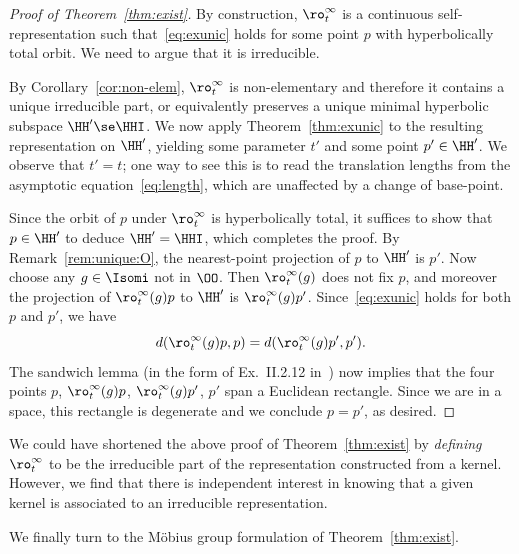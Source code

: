 \begin{proof}[Proof of Theorem~\ref{thm:exist}]
By construction, $\ro^\infty_t$ is a continuous self-representation such that~\eqref{eq:exunic} holds for some point $p$ with hyperbolically total orbit. We need to argue that it is irreducible.

By Corollary~\ref{cor:non-elem}, $\ro^\infty_t$ is non-elementary and therefore it contains a unique irreducible part, or equivalently preserves a unique minimal hyperbolic subspace $\HH'\se\HHI$. We now apply Theorem~\ref{thm:exunic} to the resulting representation on $\HH'$, yielding some parameter $t'$ and some point $p'\in\HH'$. We observe that $t'=t$; one way to see this is to read the translation lengths from the asymptotic equation~\eqref{eq:length}, which are unaffected by a change of base-point.

Since the orbit of $p$ under $\ro^\infty_t$ is hyperbolically total, it suffices to show that $p\in\HH'$ to deduce $\HH'=\HHI$, which completes the proof. By Remark~\ref{rem:unique:O}, the nearest-point projection of $p$ to $\HH'$ is $p'$. Now choose any $g\in \Isomi$ not in $\OO$. Then $\ro^\infty_t(g)$ does not fix $p$, and moreover the projection of $\ro^\infty_t(g)p$ to $\HH'$ is $\ro^\infty_t(g)p'$. Since~\eqref{eq:exunic} holds for both $p$ and $p'$, we have
\[
d(\ro^\infty_t(g)p, p) = d(\ro^\infty_t(g)p', p').
\]
The sandwich lemma (in the form of Ex.~II.2.12 in~\cite{Bridson-Haefliger}) now implies that the four points $p$, $\ro^\infty_t(g)p$, $\ro^\infty_t(g)p'$, $p'$ span a Euclidean rectangle. Since we are in a  space, this rectangle is degenerate and we conclude $p=p'$, as desired.
\end{proof}

\begin{rema}
We could have shortened the above proof of Theorem~\ref{thm:exist} by \emph{defining} $\ro^\infty_t$ to be the irreducible part of the representation constructed from a kernel. However, we find that there is independent interest in knowing that a given kernel is associated to an irreducible representation.
\end{rema}

We finally turn to the M\"obius group formulation of Theorem~\ref{thm:exist}.

